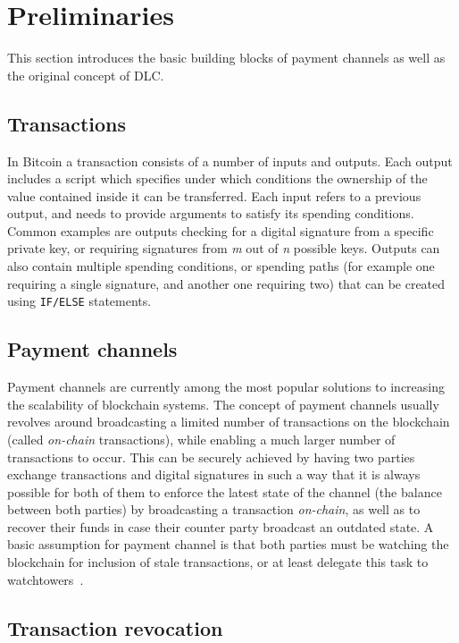 \section{Preliminaries}\label{sec:prel}

This section introduces the basic building blocks of payment channels as well as the original concept of DLC.

\subsection{Transactions}

In Bitcoin a transaction consists of a number of inputs and outputs.
Each output includes a script which specifies under which conditions the ownership of the value contained inside it can be transferred.
Each input refers to a previous output, and needs to provide arguments to satisfy its spending conditions.
Common examples are outputs checking for a digital signature from a specific private key, or requiring signatures from \emph{m} out of \emph{n} possible keys.
Outputs can also contain multiple spending conditions, or spending paths (for example one requiring a single signature, and another one requiring two) that can be created using \Verb_IF/ELSE_ statements.

\subsection{Payment channels}

Payment channels are currently among the most popular solutions to increasing the scalability of blockchain systems.
The concept of payment channels usually revolves around broadcasting a limited number of transactions on the blockchain (called \emph{on-chain} transactions), while enabling a much larger number of transactions to occur.
This can be securely achieved by having two parties exchange transactions and digital signatures in such a way that it is always possible for both of them to enforce the latest state of the channel (the balance between both parties) by broadcasting a transaction \emph{on-chain}, as well as to recover their funds in case their counter party broadcast an outdated state.
A basic assumption for payment channel is that both parties must be watching the blockchain for inclusion of stale transactions, or at least delegate this task to watchtowers~\cite{khabbazian2019}.

\subsection{Transaction revocation}\label{sec:trrev}

